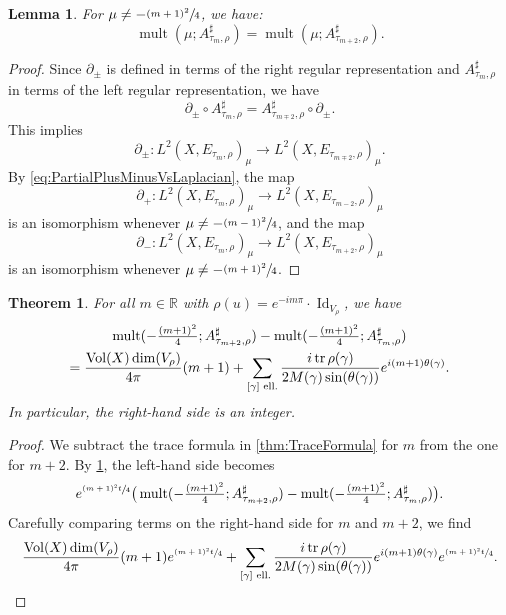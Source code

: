 \documentclass[10pt]{amsart}
\theoremstyle{plain}
\newtheorem{lem}[thm]{Lemma}
\newtheorem{theorem}[thm]{Theorem}
\theoremstyle{definition}
\theoremstyle{remark}
\newcommand{\R}{\mathbb{R}}
\DeclareMathOperator{\tr}{tr}
\DeclareMathOperator{\Vol}{Vol}
\DeclareMathOperator{\Id}{Id}
\numberwithin{equation}{section}
\DeclareMathOperator{\mult}{mult}
\begin{document}
\begin{lem}\label{lem:MultiplicitiesModM}
For $\mu\neq-\sfrac{(m+1)^2}{4}$, we have:
\[
\mult(\mu;A_{\tau_m,\rho}^\sharp) = \mult(\mu;A_{\tau_{m+2},\rho}^\sharp).
\]
\end{lem}

\begin{proof}
Since $\partial_\pm$ is defined in terms of the right regular representation and $A_{\tau_m,\rho}^\sharp$ in terms of the left regular representation, we have
\[
\partial_\pm\circ A_{\tau_m,\rho}^\sharp = A_{\tau_{m\mp2},\rho}^\sharp\circ\partial_\pm.
\]
This implies
\[
\partial_\pm:L^2(X,E_{\tau_m,\rho})_\mu\to L^2(X,E_{\tau_{m\mp2},\rho})_\mu.
\]
By \cref{eq:PartialPlusMinusVsLaplacian}, the map
\[
\partial_+:L^2(X,E_{\tau_m,\rho})_\mu\to L^2(X,E_{\tau_{m-2},\rho})_\mu
\]
is an isomorphism whenever $\mu\neq-\sfrac{(m-1)^2}{4}$, and the map
\[
\partial_-:L^2(X,E_{\tau_m,\rho})_\mu\to L^2(X,E_{\tau_{m+2},\rho})_\mu
\]
is an isomorphism whenever $\mu\neq-\sfrac{(m+1)^2}{4}$.
\end{proof}

\begin{theorem}\label{thm:DimensionEigenspaces}
For all $m\in\R$ with $\rho(u)=e^{-im\pi}\cdot\Id_{V_\rho}$, we have
\begin{multline*}
\mult(-\tfrac{(m+1)^2}{4};A_{\tau_{m+2},\rho}^\sharp)-\mult(-\tfrac{(m+1)^2}{4};A_{\tau_m,\rho}^\sharp)\\
= \frac{\Vol(X)\dim(V_\rho)}{4\pi}(m+1) +\sum_{[\gamma]\textup{ ell.}}\frac{i\tr\rho(\gamma)}{2M(\gamma)\sin(\theta(\gamma))}e^{i(m+1)\theta(\gamma)}.
\end{multline*}
In particular, the right-hand side is an integer.
\end{theorem}

\begin{proof}
We subtract the trace formula in \cref{thm:TraceFormula} for $m$ from the one for $m+2$. By \cref{lem:MultiplicitiesModM}, the left-hand side becomes
\[
e^{\sfrac{(m+1)^2t}{4}}\big(\mult(-\tfrac{(m+1)^2}{4};A_{\tau_{m+2},\rho}^\sharp)-\mult(-\tfrac{(m+1)^2}{4};A_{\tau_m,\rho}^\sharp)\big).
\]
Carefully comparing terms on the right-hand side for $m$ and $m+2$, we find
\begin{equation*}
\frac{\Vol(X)\dim(V_\rho)}{4\pi}(m+1)e^{\sfrac{(m+1)^2t}{4}}+\sum_{[\gamma]\textup{ ell.}}\frac{i\tr\rho(\gamma)}{2M(\gamma)\sin(\theta(\gamma))}e^{i(m+1)\theta(\gamma)}e^{\sfrac{(m+1)^2t}{4}}.\qedhere
\end{equation*}
\end{proof}
\end{document}
